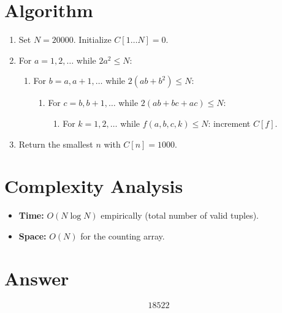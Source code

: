 \documentclass[11pt,a4paper]{article}
\begin{document}
\section{Algorithm}

\begin{enumerate}
\item Set $N = 20000$. Initialize $C[1 \ldots N] = 0$.
\item For $a = 1, 2, \ldots$ while $2a^2 \le N$:
\begin{enumerate}
\item For $b = a, a+1, \ldots$ while $2(ab + b^2) \le N$:
\begin{enumerate}
\item For $c = b, b+1, \ldots$ while $2(ab+bc+ac) \le N$:
\begin{enumerate}
\item For $k = 1, 2, \ldots$ while $f(a,b,c,k) \le N$: increment $C[f]$.
\end{enumerate}
\end{enumerate}
\end{enumerate}
\item Return the smallest $n$ with $C[n] = 1000$.
\end{enumerate}

\section{Complexity Analysis}

\begin{itemize}
\item \textbf{Time:} $O(N \log N)$ empirically (total number of valid tuples).
\item \textbf{Space:} $O(N)$ for the counting array.
\end{itemize}

\section{Answer}

\[
\boxed{18522}
\]
\end{document}

